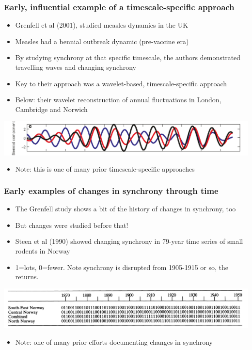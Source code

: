 \documentclass{beamer}
\begin{document}
\begin{frame}
\frametitle{Early, influential example of a timescale-specific approach}
\begin{itemize}
\item Grenfell et al (2001), studied measles dynamics in the UK
\item Measles had a bennial outbreak dynamic (pre-vaccine era)
\item By studying synchrony at that specific timescale, the authors demonstrated travelling waves and changing synchrony
\item Key to their approach was a wavelet-based, timescale-specific approach
\item Below: their wavelet reconstruction of annual fluctuations in London, Cambridge and Norwich
\end{itemize}
\includegraphics[width=\textwidth]{figures/Grenfell_etal_2001_3.png}
\begin{itemize}
\item Note: this is one of many prior timescale-specific approaches
\end{itemize}
\end{frame}

\begin{frame}
\frametitle{Early examples of changes in synchrony through time}
\begin{itemize}
\item The Grenfell study shows a bit of the history of changes in synchrony, too
\item But changes were studied before that! 
\item Steen et al (1990) showed changing synchrony in 79-year time series of small rodents in Norway
\item 1=lots, 0=fewer. Note synchrony is disrupted from 1905-1915 or so, the returns.
\end{itemize}
\includegraphics[width=\textwidth]{figures/Steen_etal_1990_3.png}
\begin{itemize}
\item Note: one of many prior efforts documenting changes in synchrony
\end{itemize}
\end{frame}
\end{document}

